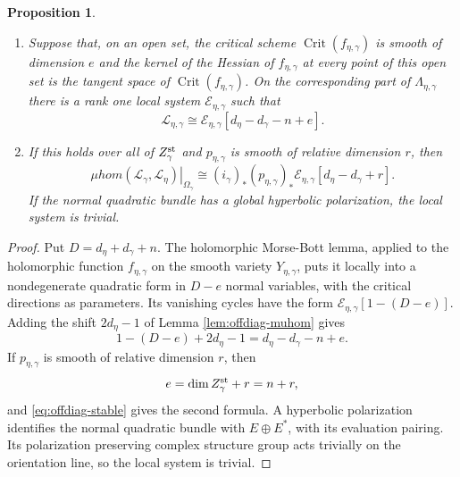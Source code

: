 \documentclass[11pt,reqno]{amsart}
\newtheorem{Proposition}[Theorem]{Proposition}
\theoremstyle{definition}
\theoremstyle{remark}
\def\muhom{\mu hom}
\begin{document}
\begin{Proposition}\label{prop:offdiag-morse-bott}\hfill
\begin{enumerate}[label=$\mathrm{(\alph*)}$,leftmargin=8mm]
\item 
Suppose that, on an open set,  the {critical scheme} $\operatorname{Crit}(f_{\eta,\gamma})$
is smooth of dimension $e$ and the kernel of the
Hessian of $f_{\eta,\gamma}$ at every point of this open set
is the tangent space of $\operatorname{Crit}(f_{\eta,\gamma})$.
On the corresponding part of $\Lambda_{\eta,\gamma}$ there is
a rank one  local system
$\mathcal E_{\eta,\gamma}$ such that
\begin{equation}\label{eq:offdiag-morse-bott}
 \mathscr L_{\eta,\gamma}
 \cong\mathcal E_{\eta,\gamma}
                 [d_\eta-d_\gamma-n+e].
\end{equation}
\item
If this holds over all of $Z_\gamma^{\rm st}$ and
$p_{\eta,\gamma}$ is smooth of relative dimension $r$, then
\[
 \left.\muhom(\mathscr L_\gamma,\mathscr L_\eta)\right|_{\Omega_\gamma}
 \cong (i_\gamma)_*(p_{\eta,\gamma})_*\mathcal E_{\eta,\gamma}
                                  [d_\eta-d_\gamma+r].
\]
If the normal quadratic bundle has a global hyperbolic
polarization, the local system is trivial.
\end{enumerate}
\end{Proposition}

\begin{proof}
Put $D=d_\eta+d_\gamma+n$.
The holomorphic Morse-Bott lemma, applied to the holomorphic
function $f_{\eta,\gamma}$ on the smooth variety
$Y_{\eta,\gamma}$, puts it locally into
a nondegenerate quadratic form in $D-e$ normal variables, with
the critical directions as parameters. Its vanishing cycles have the form
$\mathcal E_{\eta,\gamma}[1-(D-e)]$.
Adding the shift $2d_\eta-1$ of Lemma \ref{lem:offdiag-muhom} gives
\[
 1-(D-e)+2d_\eta-1=d_\eta-d_\gamma-n+e.
\]
If $p_{\eta,\gamma}$ is smooth of relative dimension $r$, then
$$e=\dim Z_\gamma^{\rm st}+r=n+r,$$ and \eqref{eq:offdiag-stable} gives the second
formula. A hyperbolic polarization identifies the normal quadratic
bundle with $E\oplus E^*$, with its evaluation pairing. Its
polarization preserving complex structure group acts trivially on
the orientation line, so the local system is trivial. \end{proof}
\end{document}
